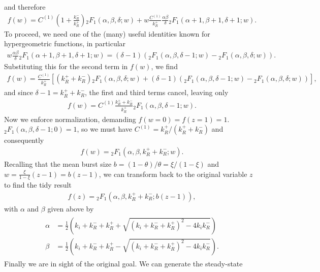 and therefore
\begin{align}
f(w) = C^{(1)}\left(1 + \frac{k_R^-}{k_R^+}\right)
        {_2F_1}(\alpha, \beta, \delta; w)
+ w \frac{C^{(1)}}{k_R^+} \frac{\alpha\beta}{\delta}
        {_2F_1}(\alpha+1, \beta+1, \delta+1; w).
\end{align}
To proceed, we need one of the (many) useful identities known for
hypergeometric functions, in particular
\begin{align}
w\frac{\alpha\beta}{\delta} {_2F_1}(\alpha+1, \beta+1, \delta+1; w)
=
(\delta-1)\left(
{_2F_1}(\alpha, \beta, \delta-1; w) - {_2F_1}(\alpha, \beta, \delta; w)
\right).
\end{align}
Substituting this for the second term in $f(w)$, we find
\begin{align}
f(w) = \frac{C^{(1)}}{k_R^+}
\left[
        \left(k_R^+ + k_R^-\right)
        {_2F_1}(\alpha, \beta, \delta; w)
+ (\delta-1)\left(
        {_2F_1}(\alpha, \beta, \delta-1; w) - {_2F_1}(\alpha, \beta, \delta; w)
        \right)
\right],
\end{align}
and since $\delta-1 = k_R^+ + k_R^-$, the first and third terms cancel,
leaving only
\begin{align}
f(w) = C^{(1)}\frac{k_R^+ + k_R^-}{k_R^+} {_2F_1}(\alpha, \beta, \delta-1; w).
\end{align}
Now we enforce normalization, demanding $f(w=0) = f(z=1) = 1$.
${_2F_1}(\alpha, \beta, \delta-1; 0) = 1$, so we must have
$C^{(1)} = k_R^+ / (k_R^+ + k_R^-)$ and consequently
\begin{align}
f(w) =  {_2F_1}(\alpha, \beta, k_R^+ + k_R^-; w).
\end{align}
Recalling that the mean burst size $b = (1-\theta)/\theta = \xi/(1-\xi)$
and $w = \frac{\xi}{1-\xi} (z-1) = b (z-1)$,
we can transform back to the original variable $z$ to find the tidy result
\begin{align}
f(z) =  {_2F_1}(\alpha, \beta, k_R^+ + k_R^-; b(z-1)),
\end{align}
with $\alpha$ and $\beta$ given above by
\begin{align}
\begin{split}
\alpha &= \frac{1}{2}
\left(k_i+k_R^-+k_R^+ + \sqrt{(k_i+k_R^-+k_R^+)^2 - 4k_i k_R^-}\right)
\\
\beta &= \frac{1}{2}
\left(k_i+k_R^-+k_R^+ - \sqrt{(k_i+k_R^-+k_R^+)^2 - 4k_i k_R^-}\right).
\end{split}
\end{align}
Finally we are in sight of the original goal. We can generate the steady-state
